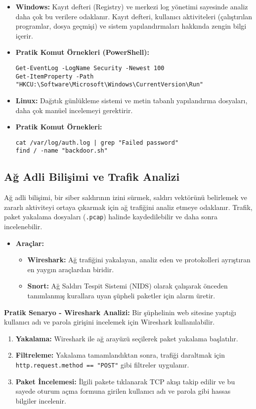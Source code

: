 \begin{itemize}
    \item \textbf{Windows:} Kayıt defteri (Registry) ve merkezi log yönetimi sayesinde analiz daha çok bu verilere odaklanır. Kayıt defteri, kullanıcı aktiviteleri (çalıştırılan programlar, dosya geçmişi) ve sistem yapılandırmaları hakkında zengin bilgi içerir.
    \item \textbf{Pratik Komut Örnekleri (PowerShell):}
    \begin{verbatim}
Get-EventLog -LogName Security -Newest 100
Get-ItemProperty -Path "HKCU:\Software\Microsoft\Windows\CurrentVersion\Run"
    \end{verbatim}
    \item \textbf{Linux:} Dağıtık günlükleme sistemi ve metin tabanlı yapılandırma dosyaları, daha çok manüel incelemeyi gerektirir.
    \item \textbf{Pratik Komut Örnekleri:}
    \begin{verbatim}
cat /var/log/auth.log | grep "Failed password"
find / -name "backdoor.sh"
    \end{verbatim}
\end{itemize}

\subsection{Ağ Adli Bilişimi ve Trafik Analizi}

Ağ adli bilişimi, bir siber saldırının izini sürmek, saldırı vektörünü belirlemek ve zararlı aktiviteyi ortaya çıkarmak için ağ trafiğini analiz etmeye odaklanır. Trafik, paket yakalama dosyaları (\texttt{.pcap}) halinde kaydedilebilir ve daha sonra incelenebilir.

\begin{itemize}
    \item \textbf{Araçlar:}
    \begin{itemize}
        \item \textbf{Wireshark:} Ağ trafiğini yakalayan, analiz eden ve protokolleri ayrıştıran en yaygın araçlardan biridir.
        \item \textbf{Snort:} Ağ Saldırı Tespit Sistemi (NIDS) olarak çalışarak önceden tanımlanmış kurallara uyan şüpheli paketler için alarm üretir.
    \end{itemize}
\end{itemize}
\textbf{Pratik Senaryo - Wireshark Analizi:}
Bir şüphelinin web sitesine yaptığı kullanıcı adı ve parola girişini incelemek için Wireshark kullanılabilir.
\begin{enumerate}
    \item \textbf{Yakalama:} Wireshark ile ağ arayüzü seçilerek paket yakalama başlatılır.
    \item \textbf{Filtreleme:} Yakalama tamamlandıktan sonra, trafiği daraltmak için \texttt{http.request.method == "POST"} gibi filtreler uygulanır.
    \item \textbf{Paket İncelemesi:} İlgili pakete tıklanarak TCP akışı takip edilir ve bu sayede oturum açma formuna girilen kullanıcı adı ve parola gibi hassas bilgiler incelenir.
\end{enumerate}

